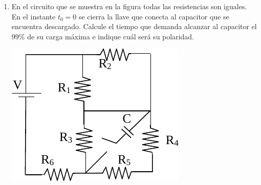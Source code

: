 \documentclass[11pt,spanish,a4paper]{article}
\begin{document}
\begin{enumerate}
	\item \begin{minipage}[t]{0.65\textwidth}
		En el circuito que se muestra en la figura todas las resistencias son iguales.
		En el instante \(t_0= 0\) se cierra la llave que conecta al capacitor que se encuentra descargado.
		Calcule el tiempo que demanda alcanzar al capacitor el \(99\%\) de su carga máxima e indique cuál será su polaridad.
    \end{minipage}
    \begin{minipage}[c][1em][t]{0.3\textwidth}
		\includegraphics[width=\textwidth]{p5e14}
    \end{minipage}



\end{enumerate}
\end{document}
